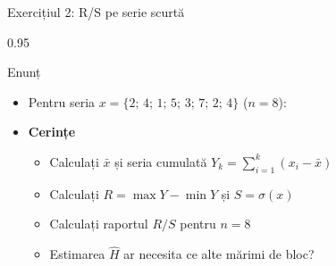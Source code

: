 \documentclass[9pt, aspectratio=169, t]{beamer}
\begin{document}
\begin{frame}[shrink=15]{Exercițiul 2: R/S pe serie scurtă}
\begin{cminipage}{0.95\textwidth}
\begin{block}{Enunț}
\begin{itemize}\setlength{\itemsep}{0pt}
    \item Pentru seria $x=\{2;\,4;\,1;\,5;\,3;\,7;\,2;\,4\}$ ($n=8$):
\end{itemize}
\end{block}
\begin{itemize}\setlength{\itemsep}{0pt}
    \item \textbf{Cerințe}
    \begin{itemize}\setlength{\itemsep}{0pt}
        \item Calculați $\bar x$ și seria cumulată $Y_k=\sum_{i=1}^k(x_i-\bar x)$
        \item Calculați $R=\max Y-\min Y$ și $S=\sigma(x)$
        \item Calculați raportul $R/S$ pentru $n=8$
        \item Estimarea $\hat H$ ar necesita ce alte mărimi de bloc?
    \end{itemize}
\end{itemize}
\end{cminipage}
\end{frame}
\end{document}
